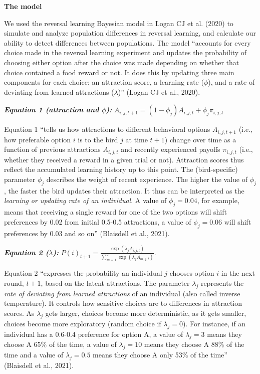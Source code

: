 \documentclass[
]{article}
\begin{document}
\textbf{The model}

We used the reversal learning Bayesian model in Logan CJ et al. (2020)
to simulate and analyze population differences in reversal learning, and
calculate our ability to detect differences between populations. The
model ``accounts for every choice made in the reversal learning
experiment and updates the probability of choosing either option after
the choice was made depending on whether that choice contained a food
reward or not. It does this by updating three main components for each
choice: an attraction score, a learning rate (\(\phi\)), and a rate of
deviating from learned attractions (\(\lambda\))'' (Logan CJ et al.,
2020).

\textbf{\emph{Equation 1 (attraction and \(\phi\)):}}
\(A_{i,j, t+1} = (1-\phi_j) A_{i,j,t} + \phi_j \pi_{i,j,t}\)

Equation 1 ``tells us how attractions to different behavioral options
\(A_{i,j, t+1}\) (i.e., how preferable option \(i\) is to the bird \(j\)
at time \(t+1\)) change over time as a function of previous attractions
\(A_{i ,j, t}\) and recently experienced payoffs \(\pi_{i,j,t}\) (i.e.,
whether they received a reward in a given trial or not). Attraction
scores thus reflect the accumulated learning history up to this point.
The (bird-specific) parameter \(\phi_j\) describes the weight of recent
experience. The higher the value of \(\phi_j\), the faster the bird
updates their attraction. It thus can be interpreted as the
\emph{learning or updating rate of an individual}. A value of
\(\phi_j = 0.04\), for example, means that receiving a single reward for
one of the two options will shift preferences by 0.02 from initial
0.5-0.5 attractions, a value of \(\phi_j = 0.06\) will shift preferences
by 0.03 and so on'' (Blaisdell et al., 2021).

\textbf{\emph{Equation 2 (\(\lambda\)):}}
\(P(i)_{t+1} = \frac{\exp(\lambda_j A_{i, j, t})}{\sum\limits_{m=1}^{2}\exp(\lambda_j A_{m, j, t})}.\)

Equation 2 ``expresses the probability an individual \(j\) chooses
option \(i\) in the next round, \(t+1\), based on the latent
attractions. The parameter \(\lambda_j\) represents the \emph{rate of
deviating from learned attractions} of an individual (also called
inverse temperature). It controls how sensitive choices are to
differences in attraction scores. As \(\lambda_j\) gets larger, choices
become more deterministic, as it gets smaller, choices become more
exploratory (random choice if \(\lambda_j = 0\)). For instance, if an
individual has a 0.6-0.4 preference for option A, a value of
\(\lambda_j = 3\) means they choose A 65\% of the time, a value of
\(\lambda_j = 10\) means they choose A 88\% of the time and a value of
\(\lambda_j = 0.5\) means they choose A only 53\% of the time''
(Blaisdell et al., 2021).
\end{document}

